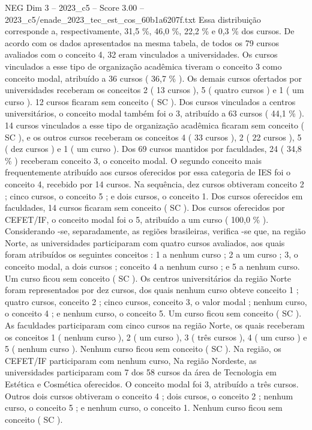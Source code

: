 \begin{textsample}{NEG Dim 3 – 2023\_c5 – Score 3.00 – 2023\_c5/enade\_2023\_tec\_est\_cos\_60b1a6207f.txt}
Essa distribuição corresponde a, respectivamente, 31,5 \%, 46,0 \%, 22,2 \% e 0,3 \% dos cursos.
De acordo com os dados apresentados na mesma tabela, de todos os 79 cursos avaliados com o conceito 4, 32 eram vinculados a universidades.
Os cursos vinculados a esse tipo de organização acadêmica tiveram o conceito 3 como conceito modal, atribuído a 36 cursos ( 36,7 \% ).
Os demais cursos ofertados por universidades receberam os conceitos 2 ( 13 cursos ), 5 ( quatro cursos ) e 1 ( um curso ). 12 cursos ficaram sem conceito ( SC ).
Dos cursos vinculados a centros universitários, o conceito modal também foi o 3, atribuído a 63 cursos ( 44,1 \% ). 14 cursos vinculados a esse tipo de organização acadêmica ficaram sem conceito ( SC ), e os outros cursos receberam os conceitos 4 ( 33 cursos ), 2 ( 22 cursos ), 5 ( dez cursos ) e 1 ( um curso ).
Dos 69 cursos mantidos por faculdades, 24 ( 34,8 \% ) receberam conceito 3, o conceito modal.
O segundo conceito mais frequentemente atribuído aos cursos oferecidos por essa categoria de IES foi o conceito 4, recebido por 14 cursos.
Na sequência, dez cursos obtiveram conceito 2 ; cinco cursos, o conceito 5 ; e dois cursos, o conceito 1.
Dos cursos oferecidos em faculdades, 14 cursos ficaram sem conceito ( SC ).
Dos cursos oferecidos por CEFET/IF, o conceito modal foi o 5, atribuído a um curso ( 100,0 \% ).
Considerando -se, separadamente, as regiões brasileiras, verifica -se que, na região Norte, as universidades participaram com quatro cursos avaliados, aos quais foram atribuídos os seguintes conceitos : 1 a nenhum curso ; 2 a um curso ; 3, o conceito modal, a dois cursos ; conceito 4 a nenhum curso ; e 5 a nenhum curso.
Um curso ficou sem conceito ( SC ).
Os centros universitários da região Norte foram representados por dez cursos, dos quais nenhum curso obteve conceito 1 ; quatro cursos, conceito 2 ; cinco cursos, conceito 3, o valor modal ; nenhum curso, o conceito 4 ; e nenhum curso, o conceito 5.
Um curso ficou sem conceito ( SC ).
As faculdades participaram com cinco cursos na região Norte, os quais receberam os conceitos 1 ( nenhum curso ), 2 ( um curso ), 3 ( três cursos ), 4 ( um curso ) e 5 ( nenhum curso ).
Nenhum curso ficou sem conceito ( SC ).
Na região, os CEFET/IF participaram com nenhum curso, Na região Nordeste, as universidades participaram com 7 dos 58 cursos da área de Tecnologia em Estética e Cosmética oferecidos.
O conceito modal foi 3, atribuído a três cursos.
Outros dois cursos obtiveram o conceito 4 ; dois cursos, o conceito 2 ; nenhum curso, o conceito 5 ; e nenhum curso, o conceito 1.
Nenhum curso ficou sem conceito ( SC ).

\end{textsample}
